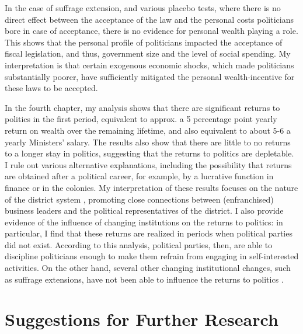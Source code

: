 In the case of suffrage extension, and various placebo tests, where there is no direct effect between the acceptance of the law and the personal costs politicians bore in case of acceptance, there is no evidence for personal wealth playing a role. This shows that the personal profile of politicians impacted the acceptance of fiscal legislation, and thus, government size and the level of social spending. My interpretation is that certain exogenous economic shocks, which made politicians substantially poorer, have sufficiently mitigated the personal wealth-incentive for these laws to be accepted. 

In the fourth chapter, my analysis shows that there are significant returns to politics in the first period, equivalent to approx. a 5 percentage point yearly return on wealth over the remaining lifetime, and also equivalent to about 5-6 a yearly Ministers' salary. The results also show that there are little to no returns to a longer stay in politics, suggesting that the returns to politics are depletable. I rule out various alternative explanations, including the possibility that returns are obtained after a political career, for example, by a lucrative function in finance or in the colonies. My interpretation of these results focuses on the nature of the district system \citep{van2018tussen}, promoting close connections between (enfranchised) business leaders and the political representatives of the district. I also provide evidence of the influence of changing institutions on the returns to politics: in particular, I find that these returns are realized in periods when political parties did not exist. According to this analysis, political parties, then, are able to discipline politicians enough to make them refrain from engaging in self-interested activities. On the other hand, several other changing institutional changes, such as suffrage extensions, have not been able to influence the returns to politics \citep{ashworth2010does}. 


\section{Suggestions for Further Research}


\clearpage




